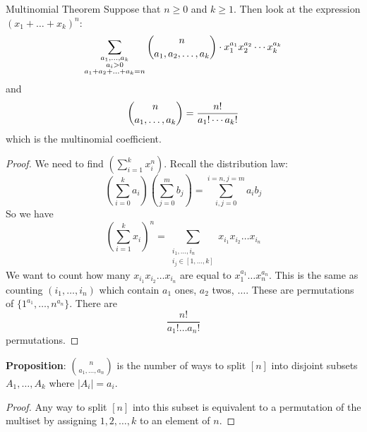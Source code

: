\documentclass{report}
\begin{document}
\begin{theorem}{Multinomial Theorem}
    Suppose that $n \geq 0$ and $k \geq 1$. Then look at the expression $(x_{1} + \ldots + x_{k})^{n}$:
        \begin{equation*}
            \sum_{\substack{a_{1}, \ldots, a_{k} \\ a_{i} > 0 \\ a_{1}+ a_{2} + \ldots + a_{k} = n}}^{} \dbinom{n}{a_{1}, a_{2}, \ldots, a_{k}} \cdot x_{1}^{a_{1}}x_{2}^{a_{2}}\cdots x_{k}^{a_{k}}
        \end{equation*}
    and 
        \begin{equation*}
            \dbinom{n}{a_{1}, \ldots, a_{k}} = \dfrac{n!}{a_{1}! \cdots a_{k}!}
        \end{equation*}
    which is the multinomial coefficient.
\end{theorem}
    \begin{proof}
        We need to find $(\sum_{i = 1}^{k} x_{i}^{n})$. Recall the distribution law:
            \begin{equation*}
                \left(\sum_{i =0 }^{k} a_{i}\right)\left(\sum_{j = 0}^{m} b_{j}\right) = \sum_{i, j = 0}^{i = n, j = m} a_{i}b_{j}
            \end{equation*}
        So we have
            \begin{equation*}
                \left(\sum_{i = 1}^{k} x_{i}\right)^{n} = \sum_{\substack{i_{1}, \ldots, i_{n} \\ i_{j} \in [1, \ldots, k]}}^{} x_{i_{1}}x_{i_{2}}\ldots x_{i_{n}}
            \end{equation*}
        We want to count how many $x_{i_{1}}x_{i_{2}}\ldots x_{i_{n}}$ are equal to $x_{1}^{a_{1}}\ldots x_{n}^{a_{n}}$. This is the same as counting $(i_{1}, \ldots, i_{n})$ which contain $a_{1}$ ones, $a_{2}$ twos, $\ldots$. These are permutations of $\{1^{a_{1}},\ldots, n^{a_{n}}\}$. There are 
            \begin{equation*}
                \dfrac{n!}{a_{1}! \ldots a_{n}!}
            \end{equation*}
        permutations.
    \end{proof}

\textbf{Proposition}: $\binom{n}{a_{1}, \ldots, a_{n}}$ is the number of ways to split $[n]$ into disjoint subsets $A_{1}, \ldots, A_{k}$ where $\lvert A_{i} \rvert = a_{i}$.
    \begin{proof}
        Any way to split $[n]$ into this subset is equivalent to a permutation of the multiset by assigning $1, 2, \ldots, k$ to an element of $n$.
    \end{proof}
\end{document}
